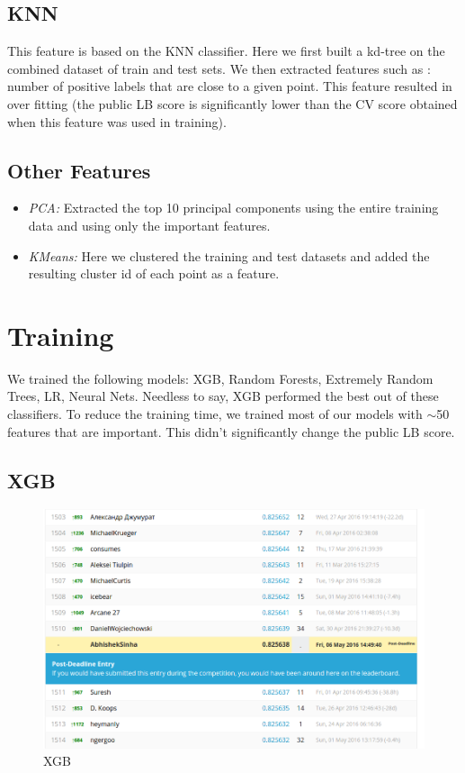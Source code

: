 \documentclass{article}
\begin{document}
\subsection{KNN}
This feature is based on the KNN classifier. Here we first built a kd-tree on the combined dataset of train and test sets. We then
extracted features such as : number of positive labels that are close to a given point. This feature resulted in over fitting (the public LB score is significantly lower than the CV score obtained when this feature was used in training).
\subsection{Other Features}
\begin{itemize}
\item \textit{PCA:} Extracted the top 10 principal components using the entire training data and using only the important features.
\item \textit{KMeans:} Here we clustered the training and test datasets and added the resulting cluster id of each point as a feature.
\end{itemize}
\section{Training}
We trained the following models: XGB, Random Forests, Extremely Random Trees, LR, Neural Nets. Needless to say, XGB performed the best out of these classifiers. To reduce the training time, we trained most of our models with $\sim$50 features that are important. This didn't significantly change the public LB score.
\subsection{XGB}
\begin{figure}[tbh]
\includegraphics[scale = 0.4]{xgb}
\caption{XGB}
\label{4a}
\end{figure}
\end{document}
